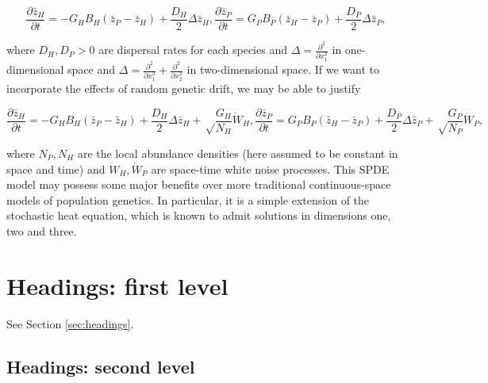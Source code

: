 \documentclass{article}
\begin{document}
\begin{subequations}
  \begin{equation}
    \frac{\partial\bar z_H}{\partial t}=-G_HB_H(\bar z_P-\bar z_H)+\frac{D_H}{2}\Delta\bar z_H,
  \end{equation}
  \begin{equation}
    \frac{\partial\bar z_P}{\partial t}=G_PB_P(\bar z_H-\bar z_P)+\frac{D_P}{2}\Delta\bar z_P,
  \end{equation}
\end{subequations}

where \(D_H,D_P>0\) are dispersal rates for each species and
\(\Delta=\frac{\partial^2}{\partial x_1^2}\) in one-dimensional space
and
\(\Delta=\frac{\partial^2}{\partial x_1^2}+\frac{\partial^2}{\partial x_2^2}\)
in two-dimensional space. If we want to incorporate the effects of
random genetic drift, we may be able to justify

\begin{subequations}
  \begin{equation}
    \frac{\partial\bar z_H}{\partial t}=-G_HB_H(\bar z_P-\bar z_H)+\frac{D_H}{2}\Delta\bar z_H+\sqrt\frac{G_H}{N_H}\dot W_H,
  \end{equation}
  \begin{equation}
    \frac{\partial\bar z_P}{\partial t}= G_PB_P(\bar z_H-\bar z_P)+\frac{D_P}{2}\Delta\bar z_P+\sqrt\frac{G_P}{N_P}\dot W_P,
  \end{equation}
\end{subequations}

where \(N_P,N_H\) are the local abundance densities (here assumed to be
constant in space and time) and \(\dot W_H,\dot W_P\) are space-time
white noise processes. This SPDE model may possess some major benefits
over more traditional continuous-space models of population genetics. In
particular, it is a simple extension of the stochastic heat equation,
which is known to admit solutions in dimensions one, two and three.

\hypertarget{headings-first-level}{%
\section{Headings: first level}\label{headings-first-level}}

\label{sec:headings}

\lipsum[4] See Section \ref{sec:headings}.

\hypertarget{headings-second-level}{%
\subsection{Headings: second level}\label{headings-second-level}}
\end{document}
